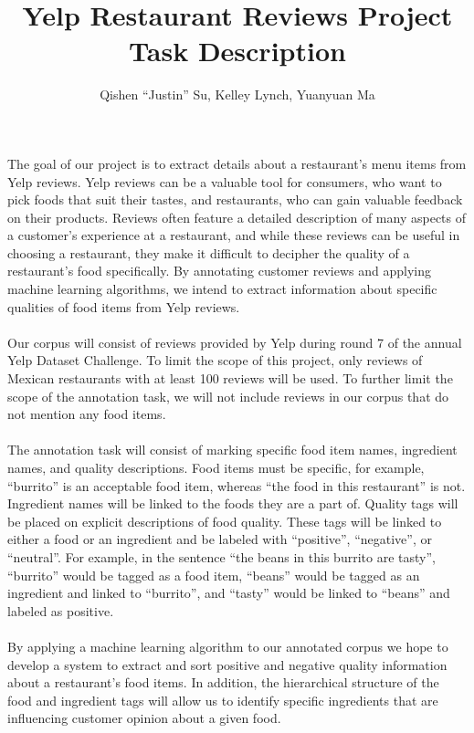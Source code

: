 \documentclass{article}
\title{Yelp Restaurant Reviews Project Task Description}
\author{Qishen ``Justin'' Su, Kelley Lynch, Yuanyuan Ma}
\begin{document}
\newpage
{}
\maketitle

\paragraph{}
The goal of our project is to extract details about a restaurant's menu items from Yelp reviews. Yelp reviews can be a valuable tool for consumers, who want to pick foods that suit their tastes, and restaurants, who can gain valuable feedback on their products. Reviews often feature a detailed description of many aspects of a customer’s experience at a restaurant, and while these reviews can be useful in choosing a restaurant, they make it difficult to decipher the quality of a restaurant’s food specifically. By annotating customer reviews and applying machine learning algorithms, we intend to extract information about specific qualities of food items from Yelp reviews.
\paragraph{}
Our corpus will consist of reviews provided by Yelp during round 7 of the annual Yelp Dataset Challenge. To limit the scope of this project, only reviews of Mexican restaurants with at least 100 reviews will be used. To further limit the scope of the annotation task, we will not include reviews in our corpus that do not mention any food items. 
\paragraph{}
The annotation task will consist of marking specific food item names, ingredient names, and quality descriptions. Food items must be specific, for example, “burrito” is an acceptable food item, whereas “the food in this restaurant” is not. Ingredient names will be linked to the foods they are a part of. Quality tags will be placed on explicit descriptions of food quality. These tags will be linked to either a food or an ingredient and be labeled with “positive”, “negative”, or “neutral”. For example, in the sentence “the beans in this burrito are tasty”, “burrito” would be tagged as a food item, “beans” would be tagged as an ingredient and linked to “burrito”, and “tasty” would be linked to “beans” and labeled as positive. 
\paragraph{}
By applying a machine learning algorithm to our annotated corpus we hope to develop a system to extract and sort positive and negative quality information about a restaurant’s food items. In addition, the hierarchical structure of the food and ingredient tags will allow us to identify specific ingredients that are influencing customer opinion about a given food. 
\end{document}
